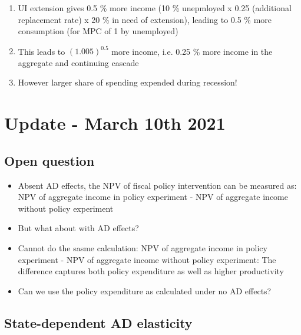 \documentclass[]{article}
\begin{document}
\begin{enumerate}
	\item UI extension gives 0.5 \% more income (10 \% unepmloyed x 0.25 (additional replacement rate) x 20 \% in need of extension), leading to 0.5 \% more consumption (for MPC of 1 by unemployed)
	\item This leads to $(1.005)^{0.5}$ more income, i.e. 0.25 \% more income in the aggregate and continuing cascade
	\item However larger share of spending expended during recession!
\end{enumerate}


\FloatBarrier
\section{Update - March 10th 2021}	

\FloatBarrier
\subsection{Open question}

\begin{itemize}
	\item Absent AD effects, the NPV of fiscal policy intervention can be measured as: NPV of aggregate income in policy experiment - NPV of aggregate income without policy experiment
	\item But what about with AD effects?
	\item Cannot do the sasme calculation: NPV of aggregate income in policy experiment - NPV of aggregate income without policy experiment: The difference captures both policy expenditure as well as higher productivity
	\item Can we use the policy expenditure as calculated under no AD effects?
\end{itemize}

\FloatBarrier
\subsection{State-dependent AD elasticity}
\end{document}

